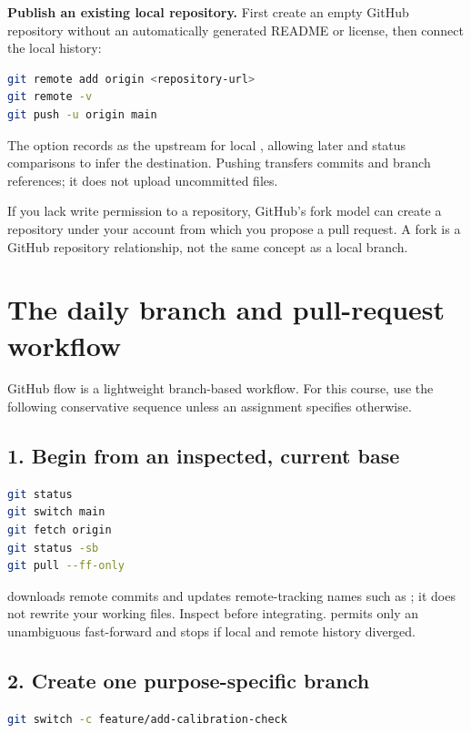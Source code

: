 \textbf{Publish an existing local repository.} First create an empty GitHub
repository without an automatically generated README or license, then connect
the local history:

\begin{lstlisting}[language=bash,numbers=none]
git remote add origin <repository-url>
git remote -v
git push -u origin main
\end{lstlisting}

The  option records  as the upstream for local
, allowing later  and status comparisons to infer the
destination. Pushing transfers commits and branch references; it does not upload
uncommitted files.

If you lack write permission to a repository, GitHub's fork model can create a
repository under your account from which you propose a pull request. A fork is
a GitHub repository relationship, not the same concept as a local branch.

\section{The daily branch and pull-request workflow}

GitHub flow is a lightweight branch-based workflow. For this course, use the
following conservative sequence unless an assignment specifies otherwise.

\subsection*{1. Begin from an inspected, current base}

\begin{lstlisting}[language=bash,numbers=none]
git status
git switch main
git fetch origin
git status -sb
git pull --ff-only
\end{lstlisting}

 downloads remote commits and updates remote-tracking names such
as ; it does not rewrite your working files. Inspect before
integrating.  permits only an unambiguous fast-forward
and stops if local and remote history diverged.

\subsection*{2. Create one purpose-specific branch}

\begin{lstlisting}[language=bash,numbers=none]
git switch -c feature/add-calibration-check
\end{lstlisting}


